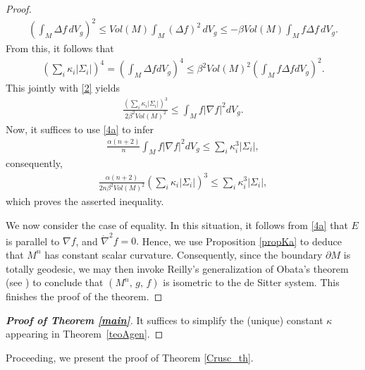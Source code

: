 \documentclass{amsart}
\numberwithin{equation}{section}
\begin{document}
\begin{proof}
		\begin{eqnarray}
		\label{holder1}
			\left(\int_{M}\Delta f\,dV_{g}\right)^{2} \leq Vol(M)\int_{M}(\Delta f)^2\,dV_{g} \leq -\beta Vol(M)\int_{M} f\Delta f\,dV_{g}.
		\end{eqnarray} From this, it follows that
		\begin{eqnarray}\label{3}
			\left(\sum_{i}\kappa_{i}\vert\Sigma_{i}\vert\right)^{4} =  \left(\int_{M}\Delta f dV_{g}\right)^{4} \leq \beta^2 Vol(M)^2\left(\int_{M} f\Delta f dV_{g}\right)^{2}.
		\end{eqnarray} This jointly with  \eqref{2} yields
		\begin{eqnarray*}
			\frac{\left(\sum_{i}\kappa_{i}\vert\Sigma_{i}\vert\right)^{3}}{2\beta^{2} Vol(M)^2} \leq \int_{M}f\vert\nabla f\vert^{2}dV_{g}.
		\end{eqnarray*} Now, it suffices to use  \eqref{4a} to infer
		\begin{eqnarray*}
\frac{\alpha(n+2)}{n}\int_{M}f\vert\nabla f\vert^{2}dV_g \leq	\sum_{i}\kappa_{i}^3\vert\Sigma_{i}\vert, 
		\end{eqnarray*}
consequently, 
	\begin{eqnarray*}
	\frac{\alpha(n+2)}{2n\beta^{2} Vol(M)^2}\left(\sum_{i}\kappa_{i}\vert\Sigma_{i}\vert\right)^{3} \leq	\sum_{i}\kappa_{i}^3\vert\Sigma_{i}\vert,
	\end{eqnarray*} which proves the asserted inequality. 
	
	
We now consider the case of equality. In this situation, it follows from \eqref{4a} that $E$ is parallel to $\nabla f$, and $\mathring{\nabla}^{2}f=0.$ Hence, we use Proposition \ref{propKa} to deduce that $M^n$ has constant scalar curvature. Consequently, since the boundary  \(\partial M\) is totally geodesic, we may then invoke Reilly's generalization of Obata’s theorem (see \cite[Lemma 3]{reilly2}) to conclude that $(M^n,\,g,\,f)$ is isometric to the de Sitter system. This finishes the proof of the theorem. 
\end{proof}
		
			
	
	
\begin{proof}[{\bf Proof of Theorem \ref{main}}]
It suffices to simplify the (unique) constant $\kappa$ appearing in Theorem~\ref{teoAgen}.
\end{proof}	

	
Proceeding, we present the proof of Theorem \ref{Crusc_th}.		
\end{document}
